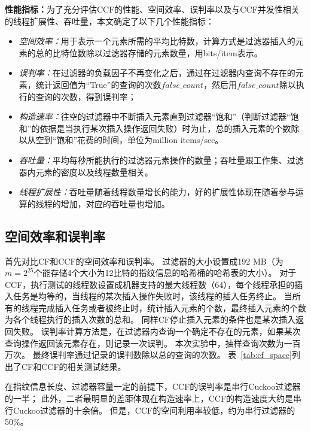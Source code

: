 \textbf{性能指标：}为了充分评估CCF的性能、空间效率、误判率以及与CCF并发性相关的线程扩展性、吞吐量，本文确定了以下几个性能指标：
\begin{itemize}
 \item \textit{空间效率：}用于表示一个元素所需的平均比特数，计算方式是过滤器插入的元素的总的比特位数除以过滤器存储的元素数量，用bits/item表示。
 \item \textit{误判率：}在过滤器的负载因子不再变化之后，通过在过滤器内查询不存在的元素，统计返回值为“True”的查询的次数$false\_count$，然后用$false\_count$除以执行的查询的次数，得到误判率；
 \item \textit{构造速率：}往空的过滤器中不断插入元素直到过滤器“饱和”（判断过滤器“饱和”的依据是当执行某次插入操作返回失败）时为止，总的插入元素的个数除以从空到“饱和”花费的时间，单位为million items/sec。
 \item \textit{吞吐量：}平均每秒所能执行的过滤器元素操作的数量；吞吐量跟工作集、过滤器内元素的密度以及线程数量相关。
 \item \textit{线程扩展性：}吞吐量随着线程数量增长的能力，好的扩展性体现在随着参与运算的线程的增加，对应的吞吐量也增加。
\end{itemize}    

\subsection{空间效率和误判率}

首先对比CF和CCF的空间效率和误判率。
过滤器的大小设置成192 MB（为$m = 2^{25}$个能存储4个大小为12比特的指纹信息的哈希桶的哈希表的大小）。
对于CCF，执行测试的线程数设置成机器支持的最大线程数（64），每个线程承担的插入任务是均等的，当线程的某次插入操作失败时，该线程的插入任务终止。
当所有的线程完成插入任务或者被终止时，统计插入元素的个数，最终插入元素的个数为各个线程执行的插入次数的总和。
同样CF停止插入元素的条件也是某次插入返回失败。
误判率计算方法是，在过滤器内查询一个确定不存在的元素，如果某次查询操作返回该元素存在，则记录一次误判。
本次实验中，抽样查询次数为一百万次。
最终误判率通过记录的误判数除以总的查询的次数。
表~\ref{tab:cf_space}列出了CF和CCF的相关测试结果。

在指纹信息长度、过滤器容量一定的前提下，CCF的误判率是串行Cuckoo过滤器的一半；
此外，二者最明显的差距体现在构造速率上，CCF的构造速度大约是串行Cuckoo过滤器的十余倍。
但是，CCF的空间利用率较低，约为串行过滤器的50\%。

